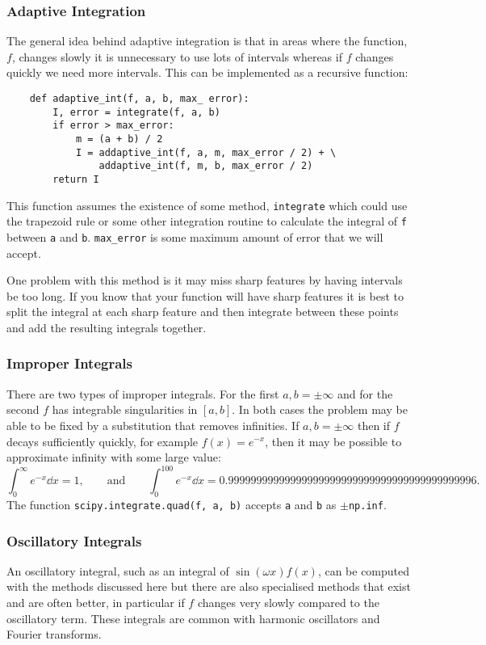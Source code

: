 \documentclass[a4paper]{article}
\begin{document}
    \subsubsection{Adaptive Integration}
    The general idea behind adaptive integration is that in areas where the function, \(f\), changes slowly it is unnecessary to use lots of intervals whereas if \(f\) changes quickly we need more intervals.
    This can be implemented as a recursive function:
    \begin{lstlisting}
    def adaptive_int(f, a, b, max_ error):
        I, error = integrate(f, a, b)
        if error > max_error:
            m = (a + b) / 2
            I = addaptive_int(f, a, m, max_error / 2) + \
                addaptive_int(f, m, b, max_error / 2)
        return I
    \end{lstlisting}
    This function assumes the existence of some method, \lstinline|integrate| which could use the trapezoid rule or some other integration routine to calculate the integral of \lstinline|f| between \lstinline|a| and \lstinline|b|.
    \lstinline|max_error| is some maximum amount of error that we will accept.
    
    One problem with this method is it may miss sharp features by having intervals be too long.
    If you know that your function will have sharp features it is best to split the integral at each sharp feature and then integrate between these points and add the resulting integrals together.
    
    \subsubsection{Improper Integrals}
    There are two types of improper integrals.
    For the first  \(a, b = \pm\infty\) and for the second \(f\) has integrable singularities in \([a, b]\).
    In both cases the problem may be able to be fixed by a substitution that removes infinities.
    If \(a, b = \pm\infty\) then if \(f\) decays sufficiently quickly, for example \(f(x) = e^{-x}\), then it may be possible to approximate infinity with some large value:
    \[\int_0^\infty e^{-x}\dd{x} = 1, \qquad\text{and}\qquad \int_0^{100} e^{-x}\dd{x} = 0.99999999999999999999999999999999999999999996.\]
    The function \lstinline|scipy.integrate.quad(f, a, b)| accepts \lstinline|a| and \lstinline|b| as \(\pm\)\lstinline|np.inf|.
    
    \subsubsection{Oscillatory Integrals}
    An oscillatory integral, such as an integral of \(\sin(\omega x)f(x)\), can be computed with the methods discussed here but there are also specialised methods that exist and are often better, in particular  if \(f\) changes very slowly compared to the oscillatory term.
    These integrals are common with harmonic oscillators and Fourier transforms.
    
\end{document}
